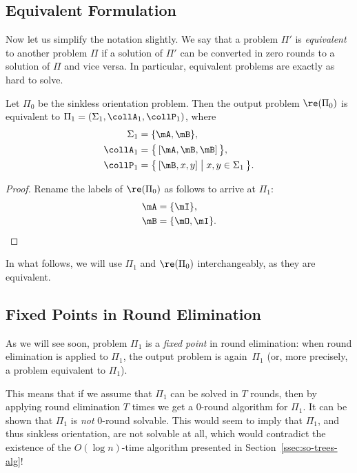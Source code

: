 \subsection{Equivalent Formulation}\label{ssec:so-output-equiv}

Now let us simplify the notation slightly. We say that a problem $\Pi'$ is \emph{equivalent} to another problem $\Pi$ if a solution of $\Pi'$ can be converted in zero rounds to a solution of $\Pi$ and vice versa. In particular, equivalent problems are exactly as hard to solve.

\begin{lemma}
	Let $\Pi_0$ be the sinkless orientation problem. Then the output problem $\re(\Pi_0)$ is equivalent to $\Pi_1 = (\Sigma_1, \collA_1, \collP_1)$, where
	\begin{align*}
		\Sigma_1 &= \{ \mA, \mB \}, \\
		\collA_1 &= \bigl\{ \, [\mA, \mB, \mB ] \, \bigr\}, \\
		\collP_1 &= \bigl\{ \, [\mB, x, y] \bigm| x,y \in \Sigma_1 \, \bigr\}.
	\end{align*}
\end{lemma}
\begin{proof}
	Rename the labels of $\re(\Pi_0)$ as follows to arrive at $\Pi_1$:
	\begin{align*}
		\mA &= \{ \mI \},\\
		\mB &= \{ \mO, \mI \}. \qedhere
	\end{align*}
\end{proof}

\noindent In what follows, we will use $\Pi_1$ and $\re(\Pi_0)$ interchangeably, as they are equivalent.

\subsection{Fixed Points in Round Elimination} \label{ssec:re-failure}

As we will see soon, problem $\Pi_1$ is a \emph{fixed point} in round elimination: when round elimination is applied to $\Pi_1$, the output problem is again~$\Pi_1$ (or, more precisely, a problem equivalent to $\Pi_1$).

This means that if we assume that $\Pi_1$ can be solved in $T$ rounds, then by applying round elimination $T$ times we get a $0$-round algorithm for $\Pi_1$. It can be shown that $\Pi_1$ is \emph{not} $0$-round solvable. This would seem to imply that $\Pi_1$, and thus sinkless orientation, are not solvable at all, which would contradict the existence of the $O(\log n)$-time algorithm presented in Section~\ref{ssec:so-trees-alg}!

